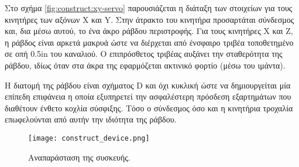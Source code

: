 Στο σχήμα \ref{fig:construct:xy-servo} παρουσιάζεται η διάταξη των στοιχείων για
τους κινητήρες των αξόνων X και Y.
Στην άτρακτο του κινητήρα προσαρτάται σύνδεσμος και, δια μέσω αυτού, το ένα άκρο
ράβδου περιστροφής. Για τους κινητήρες X και Z, η ράβδος είναι αρκετά μακρυά
ώστε να διέρχεται από ένσφαιρο τριβέα τοποθετημένο σε οπή 0.5in του καναλιού. Ο
επιπρόσθετος τριβέας αυξάνει την σταθερότητα της ράβδου, ιδίως όταν στα άκρα της
εφαρμόζεται ακτινικό φορτίο (μέσω του ιμάντα).

Η διατομή της ράβδου είναι σχήματος D και όχι κυκλική ώστε να δημιουργείται μία
επίπεδη επιφάνεια η οποία εξυπηρετεί την ασφαλέστερη πρόσδεση εξαρτημάτων που
διαθέτουν ένθετο κοχλία σύσφιξης. Τόσο ο σύνδεσμος όσο και η κινητήρια τροχαλία
επωφελούνται από αυτήν την ιδιότητα της ράβδου.

\begin{figure}
    \caption{Αναπαράσταση της συσκευής.}
    \begin{center}%
    \texttt{[image: construct\_device.png]}
    \end{center}
\end{figure}
















